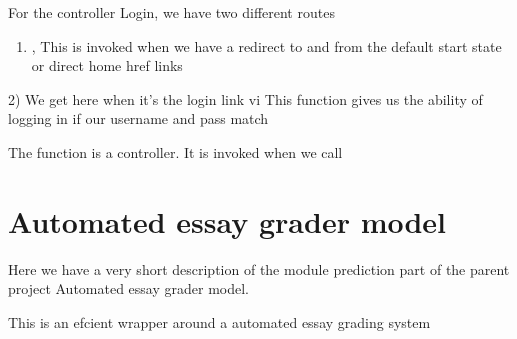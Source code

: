 \documentclass[letterpaper,10pt,english]{sphinxmanual}
\begin{document}

\begin{fulllineitems}
\label{\detokenize{main:main.login}}
For the controller Login, we have two different routes
\begin{enumerate}
%
\item {} 
, This is invoked when we have a redirect to and from the default start state or direct home href links

\end{enumerate}

2)  We get here when it’s the login link vi
This function gives us the ability of logging in if our username and pass match

\end{fulllineitems}


\begin{fulllineitems}
\label{\detokenize{main:main.show_index}}
The function is a controller. It is invoked when we call 

\end{fulllineitems}



\section{Automated essay grader model}
\label{\detokenize{prediction:automated-essay-grader-model}}\label{\detokenize{prediction::doc}}
Here we have a very short description of the module prediction part of the parent project Automated essay grader model.

This is an efcient wrapper around a automated essay grading system

\label{\detokenize{prediction:module-prediction}}
\end{document}
